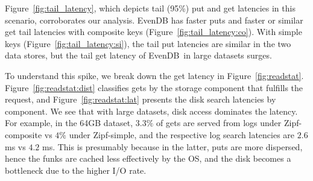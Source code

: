 \documentclass[sigplan,10pt]{acmart}
\newcommand{\sys}{EvenDB}
\begin{document}
Figure~\ref{fig:tail_latency}, which depicts tail (95\%) put and get latencies in this scenario, 
corroborates our analysis. \sys\/ has faster puts and faster or similar get tail latencies with composite keys
(Figure~\ref{fig:tail_latency:co}). With simple keys (Figure~\ref{fig:tail_latency:si}),  
the tail put latencies are similar in the two data stores, but the tail get latency of \sys\ 
in large datasets surges.

 To understand this spike, 
we break down the get latency in  Figure~\ref{fig:readstat}. 
Figure~\ref{fig:readstat:dist} classifies gets by the storage  component 
that fulfills the request, and Figure~\ref{fig:readstat:lat} presents the disk search latencies by component. 
We see that with large datasets, disk access dominates the latency.
For example, in the 64GB dataset, $3.3\%$ of gets are served from logs under Zipf-composite vs $4\%$ under Zipf-simple,
and the respective log search latencies are $2.6$ ms vs $4.2$ ms. This is presumably because in the latter, puts are more dispersed, 
hence the funks are cached less effectively by the OS, and the disk becomes a bottleneck due to the higher I/O rate.
\end{document}
